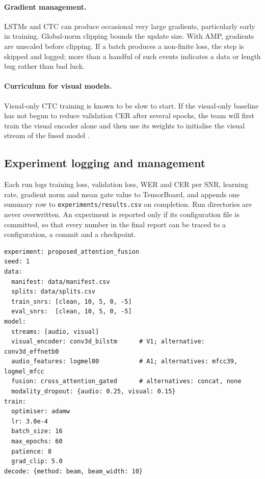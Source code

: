 \paragraph{Gradient management.} LSTMs and CTC can produce occasional very large
gradients, particularly early in training. Global-norm clipping bounds the update
size. With AMP, gradients are unscaled before clipping. If a batch produces a
non-finite loss, the step is skipped and logged; more than a handful of such
events indicates a data or length bug rather than bad luck.

\paragraph{Curriculum for visual models.} Visual-only CTC training is known to be
slow to start. If the visual-only baseline has not begun to reduce validation
CER after several epochs, the team will first train the visual encoder alone and
then use its weights to initialise the visual stream of the fused model \tbd.

\subsection{Experiment logging and management}
Each run logs training loss, validation loss, WER and CER per SNR, learning rate,
gradient norm and mean gate value to TensorBoard, and appends one summary row to
\texttt{experiments/results.csv} on completion. Run directories are never
overwritten. An experiment is reported only if its configuration file is
committed, so that every number in the final report can be traced to a
configuration, a commit and a checkpoint.

\begin{lstlisting}[language={},caption={Abbreviated experiment configuration for the proposed model \rec.},label={lst:config}]
experiment: proposed_attention_fusion
seed: 1
data:
  manifest: data/manifest.csv
  splits: data/splits.csv
  train_snrs: [clean, 10, 5, 0, -5]
  eval_snrs:  [clean, 10, 5, 0, -5]
model:
  streams: [audio, visual]
  visual_encoder: conv3d_bilstm      # V1; alternative: conv3d_effnetb0
  audio_features: logmel80           # A1; alternatives: mfcc39, logmel_mfcc
  fusion: cross_attention_gated      # alternatives: concat, none
  modality_dropout: {audio: 0.25, visual: 0.15}
train:
  optimiser: adamw
  lr: 3.0e-4
  batch_size: 16
  max_epochs: 60
  patience: 8
  grad_clip: 5.0
decode: {method: beam, beam_width: 10}
\end{lstlisting}

